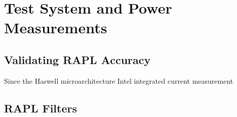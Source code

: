 \chapter{Test System and Power Measurements}

\section{Validating RAPL Accuracy}
Since the Haswell microarchitecture Intel integrated current measurement 

\section{RAPL Filters}
